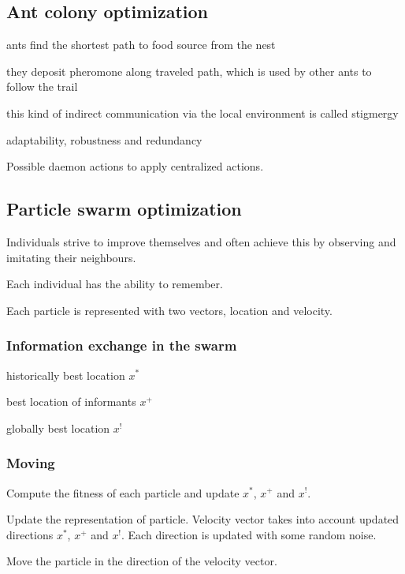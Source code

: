 \documentclass[a4paper]{article}
\begin{document}
\begin{multicols*}{2}
{\subsection{Ant colony optimization}
\begin{compactitem}
	\item ants find the shortest path to food source from the nest
	\item they deposit pheromone along traveled path, which is used by other ants to follow the trail
	\item this kind of indirect communication via the local environment is called stigmergy
	\item adaptability, robustness and redundancy
\end{compactitem}
Possible daemon actions to apply centralized actions.
\subsection{Particle swarm optimization}
\begin{compactitem}
	\item Individuals strive to improve themselves and often achieve this by observing and imitating their neighbours.
	\item Each individual has the ability to remember.
	\item Each particle is represented with two vectors, location and velocity.
\end{compactitem}
\subsubsection{Information exchange in the swarm}
\begin{compactitem}
	\item historically best location $x^*$
	\item best location of informants $x^+$
	\item globally best location $x^!$
\end{compactitem}
\subsubsection{Moving}
\begin{compactitem}
	\item Compute the fitness of each particle and update $x^*$, $x^+$ and $x^!$.
	\item Update the representation of particle.
	Velocity vector takes into account updated directions $x^*$, $x^+$ and $x^!$.
	Each direction is updated with some random noise.
	\item Move the particle in the direction of the velocity vector.
\end{compactitem}

}
\end{multicols*}
\end{document}
